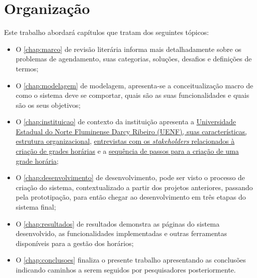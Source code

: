 
\section{Organização} \label{sec:Organização}            %

Este trabalho abordará capítulos que tratam dos seguintes tópicos:

\begin{itemize}
      \item O \autoref{chap:marco} de revisão literária informa mais detalhadamente sobre os problemas de agendamento, suas categorias, soluções, desafios e definições de termos;
      \item O \autoref{chap:modelagem} de modelagem, apresenta-se a conceitualização macro de como o sistema deve se comportar, quais são as suas funcionalidades e quais são os seus objetivos;
      \item O \autoref{chap:instituicao} de contexto da instituição apresenta a \hyperref[sec:estatuto]{Universidade Estadual do Norte Fluminense Darcy Ribeiro (UENF), suas características, estrutura organizacional}, \hyperref[sec:entrevistas]{entrevistas com os \textit{stakeholders} relacionados à criação de grades horárias} e a \hyperref[sec:sequencia]{sequência de passos para a criação de uma grade horária};
      \item O \autoref{chap:desenvolvimento} de desenvolvimento, pode ser visto o processo de criação do sistema, contextualizado a partir dos projetos anteriores, passando pela prototipação, para então chegar ao desenvolvimento em três etapas do sistema final;
      \item O \autoref{chap:resultados} de resultados demonstra as páginas do sistema desenvolvido, as funcionalidades implementadas e outras ferramentas disponíveis para a gestão dos horários;
      \item O \autoref{chap:conclusoes} finaliza o presente trabalho apresentando as conclusões indicando caminhos a serem seguidos por pesquisadores posteriormente.
\end{itemize}
